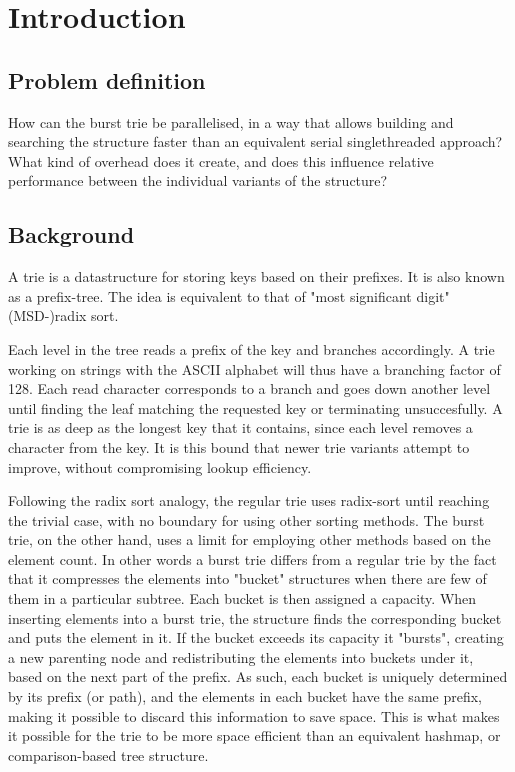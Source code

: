 \chapter{Introduction}

\section{Problem definition}
How can the burst trie be parallelised, in a way that allows building and searching
the structure faster than an equivalent serial singlethreaded approach?
What kind of overhead does it create, and does this influence relative
performance between the individual variants of the structure?


\section{Background}
A trie is a datastructure for storing keys based on their prefixes.
It is also known as a prefix-tree. The idea is equivalent to that of
"most significant digit" (MSD-)radix sort.

Each level in the tree reads a prefix of the key and branches accordingly.
A trie working on strings with the ASCII alphabet will thus have a branching
factor of 128. Each read character corresponds to a branch and goes down another
level until finding the leaf matching the requested key or terminating
unsuccesfully. A trie is as deep as the longest key that it contains, since
each level removes a character from the key. It is this bound that newer trie
variants attempt to improve, without compromising lookup efficiency.

Following the radix sort analogy, the regular trie uses radix-sort until
reaching the trivial case, with no boundary for using other sorting methods.
The burst trie, on the other hand, uses a limit for employing other methods
based on the element count. In other words a burst trie differs from a regular
trie by the fact that it compresses the elements into "bucket" structures when
there are few of them in a particular subtree. Each bucket is then assigned a
capacity. When inserting elements into a burst trie, the structure finds the
corresponding bucket and puts the element in it. If the bucket exceeds its
capacity it "bursts", creating a new parenting node and redistributing the
elements into buckets under it, based on the next part of the prefix. As such,
each bucket is uniquely determined by its prefix (or path), and the elements in
each bucket have the same prefix, making it possible to discard this
information to save space.
This is what makes it possible for the trie to be more space efficient than an
equivalent hashmap, or comparison-based tree structure.


